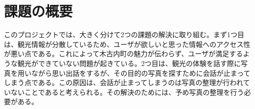 \section{課題の概要}\label{sec:gaiyou}
このプロジェクトでは、大きく分けて2つの課題の解決に取り組む。まず1つ目は、観光情報が分散しているため、ユーザが欲しいと思った情報へのアクセス性が悪い点である。これによって木古内町の魅力が伝わらず、ユーザが満足するような観光ができていない問題が起きている。2つ目は、観光の体験を話す際に写真を用いながら思い出話をするが、その目的の写真を探すために会話が止まってしまう点である。この原因は、会話が止まってしまうのは写真の整理が行われていないことであると考えられる。その解決のためには、予め写真の整理を行う必要がある。
